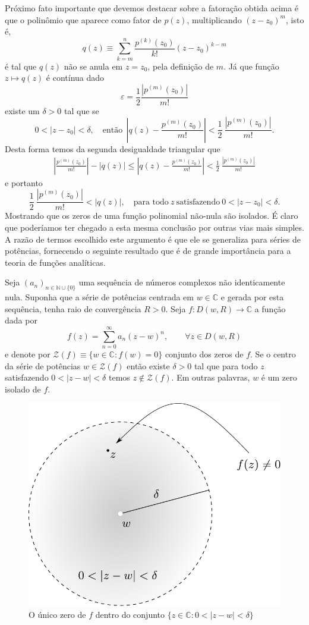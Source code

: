 Próximo fato importante que devemos destacar sobre a fatoração obtida acima é que 
o polinômio que aparece como fator de $p(z)$, multiplicando $(z-z_0)^m$, isto é,
\[
q(z) \equiv \sum_{k=m}^{n}\frac{p^{(k)}(z_0)}{k!}(z-z_0)^{k-m} 
\]
é tal que $q(z)$ não se anula em $z=z_0$, pela definição de $m$. 
Já que função $z\longmapsto q(z)$ é contínua dado 
\[ 
\varepsilon = \frac{1}{2}\frac{|p^{(m)}(z_0)|}{m!} 
\]
existe um $\delta>0$ tal que se 
\[
0<|z-z_0|<\delta, 
\quad\text{então}\ \ 
\left| q(z) - \frac{p^{(m)}(z_0)}{m!}\right|
<
\frac{1}{2}\ \frac{|p^{(m)}(z_0)|}{m!}.
\]
Desta forma temos da segunda desigualdade triangular que
\begin{align*}
\left|\frac{p^{(m)}(z_0)}{m!}\right| - |q(z)| 
\leqslant 
\left| q(z) - \frac{p^{(m)}(z_0)}{m!}\right|
<
\frac{1}{2}\ \frac{|p^{(m)}(z_0)|}{m!}
\end{align*}
e portanto 
\[
\frac{1}{2}\ \frac{|p^{(m)}(z_0)|}{m!} <|q(z)|, 
\quad \text{para todo}\ z\ \text{satisfazendo}\ 0<|z-z_0|<\delta.
\]
Mostrando que os zeros de uma função polinomial não-nula 
são isolados. É claro que poderíamos ter chegado a esta mesma conclusão 
por outras vias mais simples. A razão de termos escolhido este argumento é que
ele se generaliza para séries de potências, fornecendo o seguinte
resultado que é de grande importância para a teoria de funções analíticas.


\begin{lema}\label{lema-centro-serie-zero-isolado}
Seja $(a_n)_{n\in\mathbb{N}\cup\{0\}}$ uma sequência de números complexos
não identicamente nula. Suponha que a série de potências 
centrada em $w\in\mathbb{C}$ e gerada por esta sequência, 
tenha raio de convergência $R>0$. 
Seja $f:D(w,R)\to\mathbb{C}$ a função dada por
\[
f(z) = \sum_{n=0}^{\infty}a_n(z-w)^n, \qquad \forall z\in D(w,R)
\]
e denote por $\mathcal{Z}(f)\equiv \{w\in\mathbb{C}: f(w)=0\}$ 
conjunto dos zeros de $f$.  Se o centro da série de potências 
$w\in \mathcal{Z}(f)$ então existe $\delta>0$ tal que 
para todo $z$ satisfazendo $0<|z-w|<\delta$ temos $z\notin \mathcal{Z}(f)$.
Em outras palavras, $w$ é um zero isolado de $f$.
\end{lema}

\begin{figure}[H]
\centering
\includegraphics[width=0.45\linewidth]{Figuras/zeros-isolados1}
\caption{O único zero de $f$ dentro do conjunto $\{z\in\mathbb{C}: 0<|z-w|<\delta\}$}
\label{fig:zeros-isolados1}
\end{figure}



